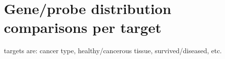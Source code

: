 \documentclass[a4paper,10pt]{article}
\begin{document}
\section{Gene/probe distribution comparisons per target}
%
targets are: cancer type, healthy/cancerous tissue, survived/diseased, etc.




\end{document}
